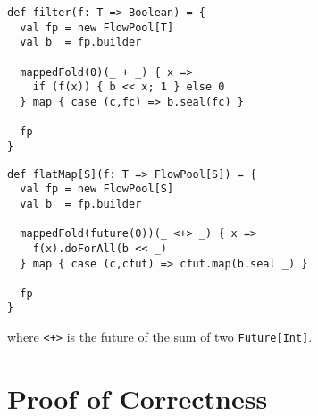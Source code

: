 \documentclass[runningheads,a4paper]{llncs}
\begin{document}
\begin{verbatim}
def filter(f: T => Boolean) = {
  val fp = new FlowPool[T]
  val b  = fp.builder

  mappedFold(0)(_ + _) { x =>
    if (f(x)) { b << x; 1 } else 0
  } map { case (c,fc) => b.seal(fc) }

  fp
}
\end{verbatim}

\begin{verbatim}
def flatMap[S](f: T => FlowPool[S]) = {
  val fp = new FlowPool[S]
  val b  = fp.builder

  mappedFold(future(0))(_ <+> _) { x =>
    f(x).doForAll(b << _)
  } map { case (c,cfut) => cfut.map(b.seal _) }

  fp
}
\end{verbatim}
where \verb|<+>| is the future of the sum of two \verb+Future[Int]+.





\appendix
\section{Proof of Correctness}


\setcounter{lemma}{0}
\setcounter{theorem}{0}
\setcounter{corollary}{0}
\setcounter{definition}{0}
\end{document}
